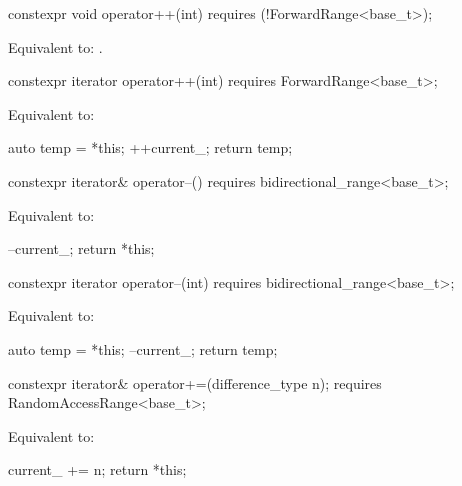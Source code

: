 \begin{itemdecl}
constexpr void operator++(int) requires (!ForwardRange<base_t>);
\end{itemdecl}

\begin{itemdescr}
\pnum
\effects
Equivalent to: .
\end{itemdescr}

\begin{itemdecl}
constexpr iterator operator++(int) requires ForwardRange<base_t>;
\end{itemdecl}

\begin{itemdescr}
\pnum
\effects Equivalent to:
\begin{codeblock}
auto temp = *this;
++current_;
return temp;
\end{codeblock}
\end{itemdescr}

\begin{itemdecl}
constexpr iterator& operator--() requires bidirectional_range<base_t>;
\end{itemdecl}

\begin{itemdescr}
\pnum
\effects
Equivalent to:
\begin{codeblock}
--current_;
return *this;
\end{codeblock}
\end{itemdescr}

\begin{itemdecl}
constexpr iterator operator--(int) requires bidirectional_range<base_t>;
\end{itemdecl}

\begin{itemdescr}
\pnum
\effects
Equivalent to:
\begin{codeblock}
auto temp = *this;
--current_;
return temp;
\end{codeblock}
\end{itemdescr}

\begin{itemdecl}
constexpr iterator& operator+=(difference_type n);
  requires RandomAccessRange<base_t>;
\end{itemdecl}

\begin{itemdescr}
\pnum
\effects
Equivalent to:
\begin{codeblock}
current_ += n;
return *this;
\end{codeblock}
\end{itemdescr}

